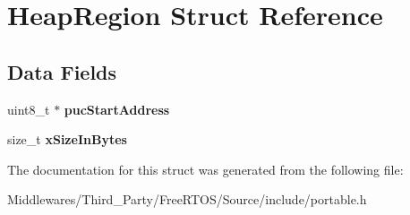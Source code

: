 \hypertarget{struct_heap_region}{}\section{Heap\+Region Struct Reference}
\label{struct_heap_region}
\subsection*{Data Fields}
\begin{DoxyCompactItemize}
\item 
\mbox{\label{struct_heap_region_a9d602a97428bd849298f05391a13968e}} 
uint8\+\_\+t $\ast$ {\bfseries puc\+Start\+Address}
\item 
\mbox{\label{struct_heap_region_ab0ed41976d9901576b117bc7981f6c98}} 
size\+\_\+t {\bfseries x\+Size\+In\+Bytes}
\end{DoxyCompactItemize}


The documentation for this struct was generated from the following file\+:\begin{DoxyCompactItemize}
\item 
Middlewares/\+Third\+\_\+\+Party/\+Free\+R\+T\+O\+S/\+Source/include/portable.\+h\end{DoxyCompactItemize}
